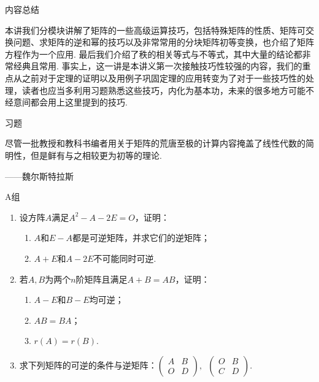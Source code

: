 \vspace{2ex}
\centerline{\heiti \Large 内容总结}

本讲我们分模块讲解了矩阵的一些高级运算技巧，包括特殊矩阵的性质、矩阵可交换问题、求矩阵的逆和幂的技巧以及非常常用的分块矩阵初等变换，也介绍了矩阵方程作为一个应用. 最后我们介绍了秩的相关等式与不等式，其中大量的结论都非常经典且常用. 事实上，这一讲是本讲义第一次接触技巧性较强的内容，我们的重点从之前对于定理的证明以及用例子巩固定理的应用转变为了对于一些技巧性的处理，读者也应当多利用习题熟悉这些技巧，内化为基本功，未来的很多地方可能不经意间都会用上这里提到的技巧.

\vspace{2ex}
\centerline{\heiti \Large 习题}

\vspace{2ex}
{\kaishu 尽管⼀批教授和教科书编者⽤关于矩阵的荒唐⾄极的计算内容掩盖了线性代数的简明性，但是鲜有与之相较更为初等的理论. }
\begin{flushright}
    \kaishu
    ——魏尔斯特拉斯
\end{flushright}

\centerline{\heiti A组}
\begin{enumerate}
    \item 设方阵$A$满足$A^2-A-2E=O$，证明：
          \begin{enumerate}
              \item $A$和$E-A$都是可逆矩阵，并求它们的逆矩阵；

              \item $A+E$和$A-2E$不可能同时可逆.
          \end{enumerate}

    \item 若$A,B$为两个$n$阶矩阵且满足$A+B=AB$，证明：
          \begin{enumerate}
              \item $A-E$和$B-E$均可逆；

              \item $AB=BA$；

              \item $r(A)=r(B)$.
          \end{enumerate}

    \item 求下列矩阵的可逆的条件与逆矩阵：$\begin{pmatrix}
            A & B \\ O & D
        \end{pmatrix},\enspace \begin{pmatrix}
            O & B \\ C & D
        \end{pmatrix}$.
\end{enumerate}

